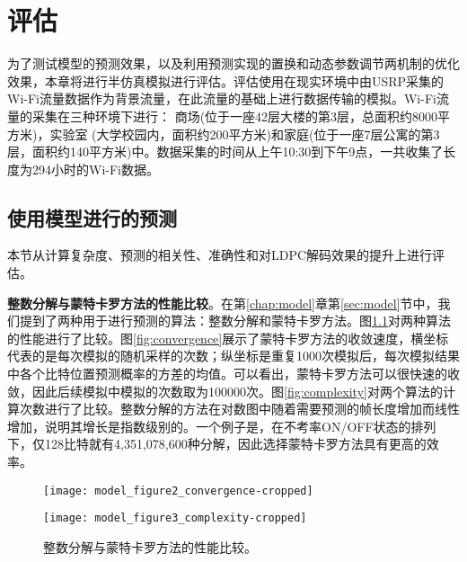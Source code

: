 
\chapter{评估}
\label{chap:evaluation}

为了测试模型的预测效果，以及利用预测实现的置换和动态参数调节两机制的优化效果，本章将进行半仿真模拟进行评估。评估使用在现实环境中由USRP采集的Wi-Fi流量数据作为背景流量，在此流量的基础上进行数据传输的模拟。Wi-Fi流量的采集在三种环境下进行：
商场(位于一座42层大楼的第3层，总面积约8000平方米)，实验室
(大学校园内，面积约200平方米)和家庭(位于一座7层公寓的第3层，面积约140平方米)中。数据采集的时间从上午10:30到下午9点，一共收集了长度为294小时的Wi-Fi数据。

\section{使用模型进行的预测}
本节从计算复杂度、预测的相关性、准确性和对LDPC解码效果的提升上进行评估。

\textbf{整数分解与蒙特卡罗方法的性能比较}。在第\ref{chap:model}章第\ref{sec:model}节中，我们提到了两种用于进行预测的算法：整数分解和蒙特卡罗方法。图\ref{fig:predict_comparison}对两种算法的性能进行了比较。图\ref{fig:convergence}展示了蒙特卡罗方法的收敛速度，横坐标代表的是每次模拟的随机采样的次数；纵坐标是重复1000次模拟后，每次模拟结果中各个比特位置预测概率的方差的均值。可以看出，蒙特卡罗方法可以很快速的收敛，因此后续模拟中模拟的次数取为100000次。图\ref{fig:complexity}对两个算法的计算次数进行了比较。整数分解的方法在对数图中随着需要预测的帧长度增加而线性增加，说明其增长是指数级别的。一个例子是，在不考率ON/OFF状态的排列下，仅128比特就有4,351,078,600种分解，因此选择蒙特卡罗方法具有更高的效率。
\begin{figure}[b]
	\begin{minipage}[b]{.5\linewidth}
		\texttt{[image: model\_figure2\_convergence-cropped]}
		\label{fig:convergence}
	\end{minipage}
	\hfill
	\begin{minipage}[b]{.5\linewidth}
		\texttt{[image: model\_figure3\_complexity-cropped]}
		\label{fig:complexity}
	\end{minipage}
	\caption{整数分解与蒙特卡罗方法的性能比较。}\label{fig:predict_comparison}
\end{figure}

